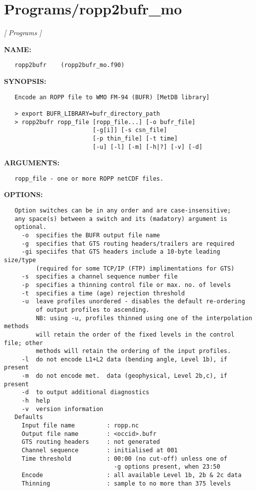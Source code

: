 \section{Programs/ropp2bufr\_mo}
\textsl{[ Programs ]}

\label{ch:robo87}
\label{ch:Programs_ropp2bufr_mo}
\textbf{NAME:}\hspace{0.08in}\begin{Verbatim}
   ropp2bufr    (ropp2bufr_mo.f90)
\end{Verbatim}
\textbf{SYNOPSIS:}\hspace{0.08in}\begin{Verbatim}
   Encode an ROPP file to WMO FM-94 (BUFR) [MetDB library]

   > export BUFR_LIBRARY=bufr_directory_path
   > ropp2bufr ropp_file [ropp_file...] [-o bufr_file]
                         [-g[i]] [-s csn_file]
                         [-p thin_file] [-t time]
                         [-u] [-l] [-m] [-h|?] [-v] [-d]
\end{Verbatim}
\textbf{ARGUMENTS:}\hspace{0.08in}\begin{Verbatim}
   ropp_file - one or more ROPP netCDF files.
\end{Verbatim}
\textbf{OPTIONS:}\hspace{0.08in}\begin{Verbatim}
   Option switches can be in any order and are case-insensitive;
   any space(s) between a switch and its (madatory) argument is
   optional.
     -o  specifies the BUFR output file name
     -g  specifies that GTS routing headers/trailers are required
     -gi speciifes that GTS headers include a 10-byte leading size/type
         (required for some TCP/IP (FTP) implimentations for GTS)
     -s  specifies a channel sequence number file
     -p  specifies a thinning control file or max. no. of levels
     -t  specifies a time (age) rejection threshold
     -u  leave profiles unordered - disables the default re-ordering
         of output profiles to ascending.
         NB: using -u, profiles thinned using one of the interpolation methods
         will retain the order of the fixed levels in the control file; other
         methods will retain the ordering of the input profiles.
     -l  do not encode L1+L2 data (bending angle, Level 1b), if present
     -m  do not encode met.  data (geophysical, Level 2b,c), if present
     -d  to output additional diagnostics
     -h  help
     -v  version information
   Defaults
     Input file name         : ropp.nc
     Output file name        : <occid>.bufr
     GTS routing headers     : not generated
     Channel sequence        : initialised at 001
     Time threshold          : 00:00 (no cut-off) unless one of
                               -g options present, when 23:50
     Encode                  : all available Level 1b, 2b & 2c data
     Thinning                : sample to no more than 375 levels
\end{Verbatim}
